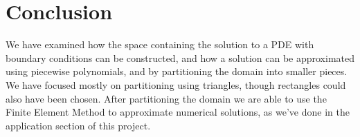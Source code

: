 \chapter{Conclusion}
We have examined how the space containing the solution to a PDE 
with boundary conditions can be constructed, and how a solution can be 
approximated using piecewise polynomials, and by partitioning the domain 
into smaller pieces.
We have focused mostly on partitioning using triangles, though rectangles could 
also have been chosen.
After partitioning the domain we are able to use the Finite Element Method to approximate numerical solutions, 
as we've done in the application section of this project.